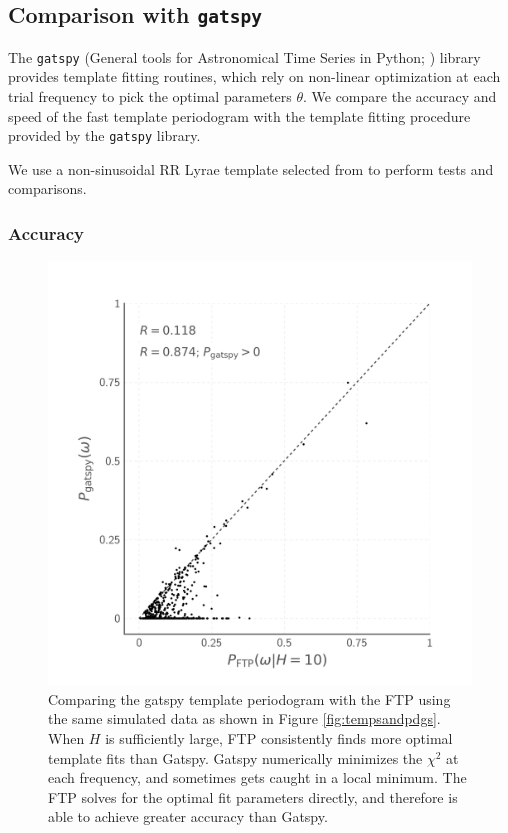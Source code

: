 \documentclass[iop]{emulateapj}
\begin{document}
\subsection{Comparison with \texttt{gatspy}}

The \texttt{gatspy} (General tools for Astronomical Time Series in Python; 
\cite{gatspy,Vanderplas+Ivezic_2015}) library provides template fitting
routines, which rely on non-linear optimization at each trial frequency
to pick the optimal parameters $\theta$. We compare the accuracy and
speed of the fast template periodogram with the template fitting
procedure provided by the \texttt{gatspy} library.

We use a non-sinusoidal RR Lyrae template selected from \cite{Sesar_etal_2010} to perform tests and comparisons.


\subsubsection{Accuracy}

\begin{figure}
    \centering
    \includegraphics[width=\textwidth]{plots/correlation_with_gatspy.png}
    \caption{\label{fig:corrwgats} Comparing the gatspy template periodogram with 
            the FTP using the same simulated data as shown in Figure \ref{fig:tempsandpdgs}.
            When $H$ is sufficiently large, FTP consistently finds more optimal template
            fits than Gatspy. Gatspy numerically minimizes the $\chi^2$ at each frequency,
            and sometimes gets caught in a local minimum. The FTP solves for the optimal
            fit parameters directly, and therefore is able to achieve greater accuracy than Gatspy.}
\end{figure}
\end{document}
